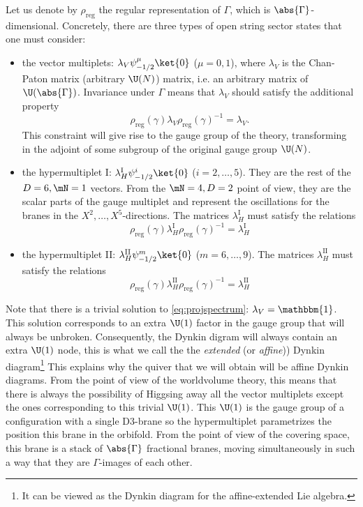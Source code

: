 \documentclass{worksheetclass}
\begin{document}
        Let us denote by $\rho_{\text{reg}}$ the regular representation of $\Gamma$, which is $\abs{\Gamma}$-dimensional. Concretely, there are three types of open string sector states that one must consider:
        \begin{itemize}
            \item the vector multiplets: $\lambda_V\psi^\mu_{-1/2}\ket{0}$ ($\mu=0,1$), where $\lambda_V$ is the Chan-Paton matrix (arbitrary $\U(N)$) matrix, i.e. an arbitrary matrix of $\U(\abs{\Gamma})$. Invariance under $\Gamma$ means that $\lambda_V$ should satisfy the additional property
            \begin{equation}
                \rho_{\text{reg}}(\gamma)\lambda_V\rho_{\text{reg}}(\gamma)^{-1}=\lambda_V.\label{eq:projspectrum}
            \end{equation}
            This constraint will give rise to the gauge group of the theory, transforming in the adjoint of some subgroup of the original gauge group $\U(N)$.
            \item the hypermultiplet I: $\lambda^{\text{I}}_H\psi^i_{-1/2}\ket{0}$ ($i=2,\dots,5$). They are the rest of the $D=6,\mN=1$ vectors. From the $\mN=4,D=2$ point of view, they are the scalar parts of the gauge multiplet and represent the oscillations for the branes in the $X^2,\dots,X^5$-directions. The matrices $\lambda^{\text{I}}_H$ must satisfy the relations
            \begin{equation}
                \rho_{\text{reg}}(\gamma)\lambda^{\text{I}}_H\rho_{\text{reg}}(\gamma)^{-1}=\lambda^{\text{I}}_H
            \end{equation}
            \item the hypermultiplet II: $\lambda^{\text{II}}_H\psi^m_{-1/2}\ket{0}$ ($m=6,\dots,9$). The matrices $\lambda^{\text{II}}_H$ must satisfy the relations
            \begin{equation}
                \rho_{\text{reg}}(\gamma)\lambda^{\text{II}}_H\rho_{\text{reg}}(\gamma)^{-1}=\lambda^{\text{II}}_H
            \end{equation}
        \end{itemize}
        Note that there is a trivial solution to \eqref{eq:projspectrum}: $\lambda_V=\mathbbm{1}$. This solution corresponds to an extra $\U(1)$ factor in the gauge group that will always be unbroken. Consequently, the Dynkin digram will always contain an extra $\U(1)$ node, this is what we call the the \emph{extended} (or \emph{affine})) Dynkin diagram\footnote{It can be viewed as the Dynkin diagram for the affine-extended Lie algebra.} This explains why the quiver that we will obtain will be affine Dynkin diagrams. From the point of view of the worldvolume theory, this means that there is always the possibility of Higgsing away all the vector multiplets except the ones corresponding to this trivial $\U(1)$. This $\U(1)$ is the gauge group of a configuration with a single D$3$-brane so the hypermultiplet parametrizes the position this brane in the orbifold. From the point of view of the covering space, this brane is a stack of $\abs{\Gamma}$ fractional branes, moving simultaneously in such a way that they are $\Gamma$-images of each other.
\end{document}
